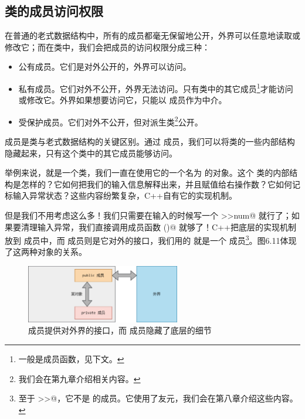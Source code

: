\subsection*{类的成员访问权限}
在普通的老式数据结构中，所有的成员都毫无保留地公开，外界可以任意地读取或修改它；而在类中，我们会把成员的访问权限分成三种：
\begin{itemize}
    \item \lstinline@public@ 公有成员。它们是对外公开的，外界可以访问。
    \item \lstinline@private@ 私有成员。它们对外不公开，外界无法访问。只有类中的其它成员\footnote{一般是成员函数，见下文。}才能访问或修改它。外界如果想要访问它，只能以 \lstinline@public@ 成员作为中介。
    \item \lstinline@protected@ 受保护成员。它们对外不公开，但对派生类\footnote{我们会在第九章介绍相关内容。}公开。
\end{itemize}
\lstinline@private@ 成员是类与老式数据结构的关键区别。通过 \lstinline@private@ 成员，我们可以将类的一些内部结构隐藏起来，只有这个类中的其它成员能够访问。\par
举例来说，\lstinline@istream@ 就是一个类，我们一直在使用它的一个名为 \lstinline@cin@ 的对象。这个 \lstinline@istream@ 类的内部结构是怎样的？它如何把我们的输入信息解释出来，并且赋值给右操作数？它如何记标输入异常状态？这些内容纷繁复杂，C++自有它的实现机制。\par
但是我们不用考虑这么多！我们只需要在输入的时候写一个 \lstinline@cin>>num@ 就行了；如果要清理输入异常，我们直接调用成员函数 \lstinline@clear()@ 就够了！C++把底层的实现机制放到 \lstinline@private@ 成员中，而 \lstinline@public@ 成员则是它对外的接口，我们用的 \lstinline@clear@ 就是一个 \lstinline@public@ 成员\footnote{至于 \lstinline@>>@，它不是 \lstinline@istream@ 的成员。它使用了友元，我们会在第八章介绍这些内容。}。图6.11体现了这两种对象的关系。\par
\begin{figure}[htbp]
    \centering
    \includegraphics[width=0.6\textwidth]{../images/generalized_parts/06_public_and_private_members.drawio.png}
    \caption{\lstinline@public@ 成员提供对外界的接口，而 \lstinline@private@ 成员隐藏了底层的细节}
\end{figure}
